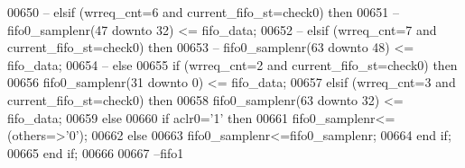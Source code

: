 \begin{DoxyCode}
00650 \textcolor{keyword}{--        elsif (wrreq\_cnt=6 and current\_fifo\_st=check0) then}
00651 \textcolor{keyword}{--          fifo0\_samplenr(47 downto 32) <= fifo\_data; }
00652 \textcolor{keyword}{--        elsif (wrreq\_cnt=7 and current\_fifo\_st=check0) then}
00653 \textcolor{keyword}{--          fifo0\_samplenr(63 downto 48) <= fifo\_data;    }
00654 \textcolor{keyword}{--        else}
00655           \textcolor{keywordflow}{if} \textcolor{vhdlchar}{(}\textcolor{vhdlchar}{wrreq_cnt}\textcolor{vhdlchar}{=}\textcolor{vhdllogic}{}\textcolor{vhdllogic}{2} \textcolor{keywordflow}{and} \textcolor{vhdlchar}{current_fifo_st}\textcolor{vhdlchar}{=}\textcolor{vhdlchar}{check0}\textcolor{vhdlchar}{)} \textcolor{keywordflow}{then} 
00656             \textcolor{vhdlchar}{fifo0_samplenr}\textcolor{vhdlchar}{(}\textcolor{vhdllogic}{}\textcolor{vhdllogic}{31} \textcolor{keywordflow}{downto} \textcolor{vhdllogic}{}\textcolor{vhdllogic}{0}\textcolor{vhdlchar}{)} \textcolor{vhdlchar}{<=} \textcolor{vhdlchar}{fifo_data};
00657           \textcolor{keywordflow}{elsif} \textcolor{vhdlchar}{(}\textcolor{vhdlchar}{wrreq_cnt}\textcolor{vhdlchar}{=}\textcolor{vhdllogic}{}\textcolor{vhdllogic}{3} \textcolor{keywordflow}{and} \textcolor{vhdlchar}{current_fifo_st}\textcolor{vhdlchar}{=}\textcolor{vhdlchar}{check0}\textcolor{vhdlchar}{)} \textcolor{keywordflow}{then}
00658             \textcolor{vhdlchar}{fifo0_samplenr}\textcolor{vhdlchar}{(}\textcolor{vhdllogic}{}\textcolor{vhdllogic}{63} \textcolor{keywordflow}{downto} \textcolor{vhdllogic}{}\textcolor{vhdllogic}{32}\textcolor{vhdlchar}{)} \textcolor{vhdlchar}{<=} \textcolor{vhdlchar}{fifo_data};    
00659           \textcolor{keywordflow}{else}
00660             \textcolor{keywordflow}{if} \textcolor{vhdlchar}{aclr0}\textcolor{vhdlchar}{=}\textcolor{vhdlchar}{'}\textcolor{vhdllogic}{}\textcolor{vhdllogic}{1}\textcolor{vhdlchar}{'} \textcolor{keywordflow}{then} 
00661               \textcolor{vhdlchar}{fifo0_samplenr}\textcolor{vhdlchar}{<=}\textcolor{vhdlchar}{(}\textcolor{keywordflow}{others}\textcolor{vhdlchar}{=}\textcolor{vhdlchar}{>}\textcolor{vhdlchar}{'}\textcolor{vhdllogic}{}\textcolor{vhdllogic}{0}\textcolor{vhdlchar}{'}\textcolor{vhdlchar}{)};
00662             \textcolor{keywordflow}{else}  
00663               \textcolor{vhdlchar}{fifo0_samplenr}\textcolor{vhdlchar}{<=}\textcolor{vhdlchar}{fifo0_samplenr};
00664             \textcolor{keywordflow}{end} \textcolor{keywordflow}{if};
00665           \textcolor{keywordflow}{end} \textcolor{keywordflow}{if};
00666             
00667 \textcolor{keyword}{          --fifo1                 }

\end{DoxyCode}
